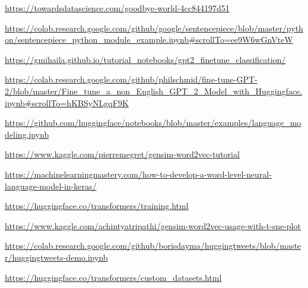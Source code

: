 \documentclass[12pt, a4paper]{article}
\begin{document}
\begin{thebibliography}{9}
	\url{https://towardsdatascience.com/goodbye-world-4cc844197d51}
	
	\url{https://colab.research.google.com/github/google/sentencepiece/blob/master/python/sentencepiece_python_module_example.ipynb#scrollTo=ee9W6wGnVteW}
	
	\url{https://gmihaila.github.io/tutorial_notebooks/gpt2_finetune_classification/}
	
	\url{https://colab.research.google.com/github/philschmid/fine-tune-GPT-2/blob/master/Fine_tune_a_non_English_GPT_2_Model_with_Huggingface.ipynb#scrollTo=hKBSyNLgqF9K}
	
	\url{https://github.com/huggingface/notebooks/blob/master/examples/language_modeling.ipynb}
	
	\url{https://www.kaggle.com/pierremegret/gensim-word2vec-tutorial}
	
	\url{https://machinelearningmastery.com/how-to-develop-a-word-level-neural-language-model-in-keras/}
	
	\url{https://huggingface.co/transformers/training.html}
	
	\url{https://www.kaggle.com/achintyatripathi/gensim-word2vec-usage-with-t-sne-plot}
	
	\url{https://colab.research.google.com/github/borisdayma/huggingtweets/blob/master/huggingtweets-demo.ipynb}
	
	\url{https://huggingface.co/transformers/custom_datasets.html}
	
	
\end{thebibliography}
\end{document}
